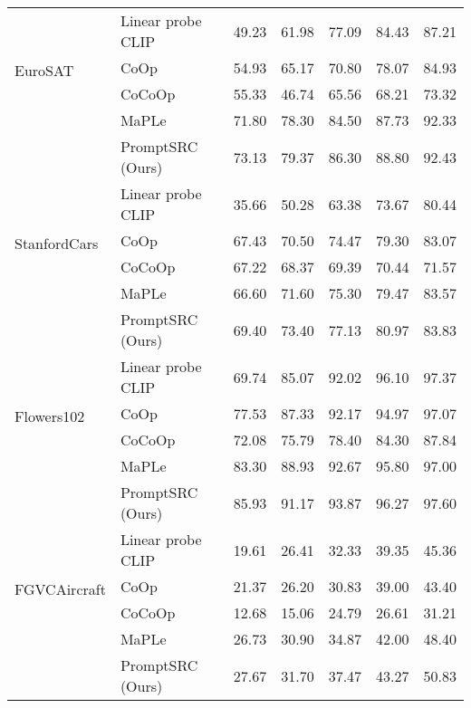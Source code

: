 \documentclass[10pt,twocolumn,letterpaper]{article}
\begin{document}
\begin{table*}[t!]
{\begin{tabular}{ll|ccccc}
                               \midrule
\multirow{4}{*}{EuroSAT}       & Linear probe CLIP       &49.23	&61.98	&77.09&	84.43	&87.21\\
                               & CoOp                   &54.93	&65.17	&70.80	&78.07	&84.93\\
                               & CoCoOp                  & 55.33	&46.74	&65.56&	68.21	&73.32\\
                                                              & MaPLe                  & 71.80	&78.30	&84.50&	87.73&	92.33\\
                              \rowcolor{tabhighlight}   & PromptSRC (Ours)             &73.13 &79.37	&86.30	&88.80	&92.43\\
\midrule
\multirow{4}{*}{StanfordCars}  & Linear probe CLIP     & 35.66	&50.28	&63.38	&73.67	&80.44\\
                           & CoOp                        &67.43	&70.50	&74.47	&79.30	&83.07\\
                                   & CoCoOp              & 67.22	&68.37	&69.39	&70.44&	71.57\\
                                                                  & MaPLe                  & 66.60	&71.60	&75.30&	79.47&	83.57\\
                              \rowcolor{tabhighlight}  &  PromptSRC (Ours)              &69.40	&73.40	&77.13	&80.97	&83.83\\
\midrule
\multirow{4}{*}{Flowers102}    & Linear probe CLIP      & 69.74	&85.07	&92.02	&96.10	&97.37\\
                               & CoOp                   & 77.53	&87.33	&92.17	&94.97	&97.07\\
                               & CoCoOp                    &72.08	&75.79	&78.40	&84.30	&87.84\\
                                                              & MaPLe                  & 83.30	&88.93	&92.67&	95.80&	97.00\\
                                \rowcolor{tabhighlight}  & PromptSRC (Ours)           & 85.93	&91.17	&93.87	&96.27	&97.60\\
                               \midrule
\multirow{4}{*}{FGVCAircraft}  & Linear probe CLIP       & 19.61	&26.41	&32.33	&39.35&	45.36\\
                               & CoOp                     & 21.37&	26.20	&30.83	&39.00	&43.40\\
                               & CoCoOp                   & 12.68	&15.06	&24.79	&26.61	&31.21\\
                                                              & MaPLe                  & 26.73	&30.90	& 34.87&	42.00&	48.40\\
                              \rowcolor{tabhighlight}   & PromptSRC (Ours)          & 27.67	&31.70	&37.47&	43.27	&50.83\\


\end{tabular}}
\end{table*}
\end{document}
